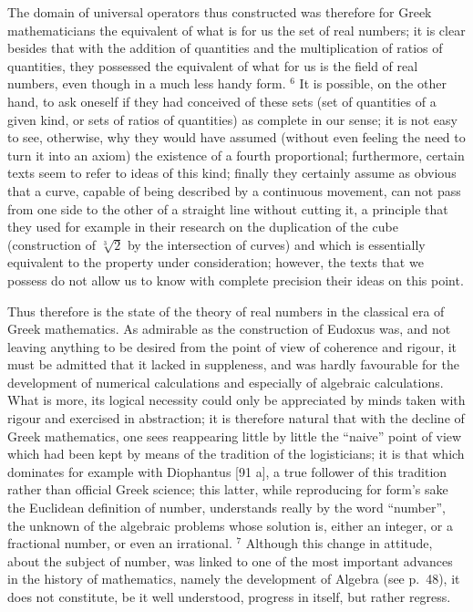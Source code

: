 The domain of universal operators thus constructed was therefore for Greek mathematicians the equivalent of what is for us the set of real numbers; it is clear besides that with the addition of quantities and the multiplication of ratios of quantities, they possessed the equivalent of what for us is the field of real numbers, even though in a much less handy form. \(^{6}\) It is possible, on the other hand, to ask oneself if they had conceived of these sets (set of quantities of a given kind, or sets of ratios of quantities) as complete in our sense; it is not easy to see, otherwise, why they would have assumed (without even feeling the need to turn it into an axiom) the existence of a fourth proportional; furthermore, certain texts seem to refer to ideas of this kind; finally they certainly assume as obvious that a curve, capable of being described by a continuous movement, can not pass from one side to the other of a straight line without cutting it, a principle that they used for example in their research on the duplication of the cube (construction of \(\sqrt[3]{2}\) by the intersection of curves) and which is essentially equivalent to the property under consideration; however, the texts that we possess do not allow us to know with complete precision their ideas on this point.

Thus therefore is the state of the theory of real numbers in the classical era of Greek mathematics. As admirable as the construction of Eudoxus was, and not leaving anything to be desired from the point of view of coherence and rigour, it must be admitted that it lacked in suppleness, and was hardly favourable for the development of numerical calculations and especially of algebraic calculations. What is more, its logical necessity could only be appreciated by minds taken with rigour and exercised in abstraction; it is therefore natural that with the decline of Greek mathematics, one sees reappearing little by little the ``naive'' point of view which had been kept by means of the tradition of the logisticians; it is that which dominates for example with Diophantus {[}91 a{]}, a true follower of this tradition rather than official Greek science; this latter, while reproducing for form's sake the Euclidean definition of number, understands really by the word ``number'', the unknown of the algebraic problems whose solution is, either an integer, or a fractional number, or even an irrational. \(^{7}\) Although this change in attitude, about the subject of number, was linked to one of the most important advances in the history of mathematics, namely the development of Algebra (see p.~48), it does not constitute, be it well understood, progress in itself, but rather regress.

